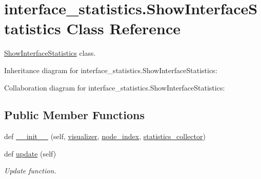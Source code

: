 \hypertarget{classinterface__statistics_1_1ShowInterfaceStatistics}{}\section{interface\+\_\+statistics.\+Show\+Interface\+Statistics Class Reference}
\label{classinterface__statistics_1_1ShowInterfaceStatistics}


\hyperlink{classinterface__statistics_1_1ShowInterfaceStatistics}{Show\+Interface\+Statistics} class.  




Inheritance diagram for interface\+\_\+statistics.\+Show\+Interface\+Statistics\+:


Collaboration diagram for interface\+\_\+statistics.\+Show\+Interface\+Statistics\+:
\subsection*{Public Member Functions}
\begin{DoxyCompactItemize}
\item 
def \hyperlink{classinterface__statistics_1_1ShowInterfaceStatistics_acdf9f1bd3026ed9a018ee70459f48ab0}{\+\_\+\+\_\+init\+\_\+\+\_\+} (self, \hyperlink{classinterface__statistics_1_1ShowInterfaceStatistics_a1547f0093ea7b91f54664f8ab6266b74}{visualizer}, \hyperlink{classinterface__statistics_1_1ShowInterfaceStatistics_abbc97003c4c6ed1b21f6825e6a6e46f7}{node\+\_\+index}, \hyperlink{classinterface__statistics_1_1ShowInterfaceStatistics_aec46892f4f5176428b1a216794387e56}{statistics\+\_\+collector})
\item 
def \hyperlink{classinterface__statistics_1_1ShowInterfaceStatistics_a81033511c519a5226d564773234a6b41}{update} (self)
\begin{DoxyCompactList}\small\item\em Update function. \end{DoxyCompactList}\end{DoxyCompactItemize}
